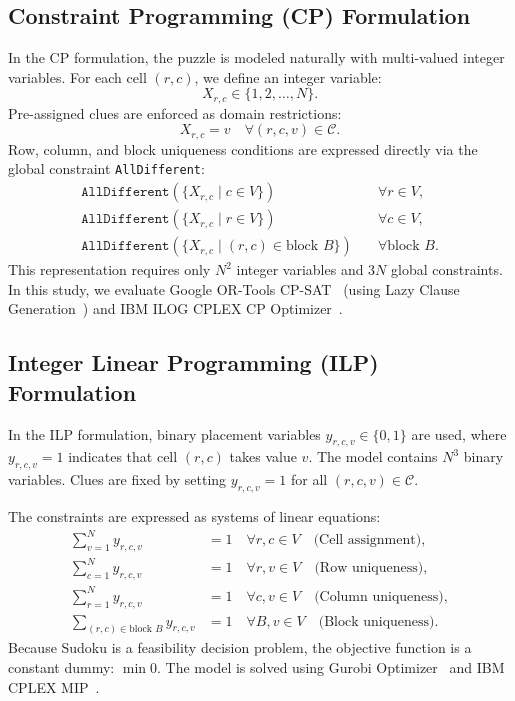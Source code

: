 \documentclass[a4paper,fleqn]{cas-sc}
\begin{document}
\subsection{Constraint Programming (CP) Formulation}
In the CP formulation, the puzzle is modeled naturally with multi-valued integer variables. For each cell $(r, c)$, we define an integer variable:
\begin{equation}
    X_{r, c} \in \{1, 2, \dots, N\}.
\end{equation}
Pre-assigned clues are enforced as domain restrictions:
\begin{equation}
    X_{r, c} = v \quad \forall (r, c, v) \in \mathcal{C}.
\end{equation}
Row, column, and block uniqueness conditions are expressed directly via the global constraint \texttt{AllDifferent}:
\begin{align}
    \texttt{AllDifferent}(\{X_{r, c} \mid c \in V\}) \quad &\forall r \in V, \\
    \texttt{AllDifferent}(\{X_{r, c} \mid r \in V\}) \quad &\forall c \in V, \\
    \texttt{AllDifferent}(\{X_{r, c} \mid (r, c) \in \text{block } B\}) \quad &\forall \text{block } B.
\end{align}
This representation requires only $N^2$ integer variables and $3N$ global constraints. In this study, we evaluate Google OR-Tools CP-SAT~\cite{ortools} (using Lazy Clause Generation~\cite{feydy2009lazy}) and IBM ILOG CPLEX CP Optimizer~\cite{cplex2022}.

\subsection{Integer Linear Programming (ILP) Formulation}
In the ILP formulation, binary placement variables $y_{r, c, v} \in \{0, 1\}$ are used, where $y_{r, c, v} = 1$ indicates that cell $(r, c)$ takes value $v$. The model contains $N^3$ binary variables. Clues are fixed by setting $y_{r, c, v} = 1$ for all $(r, c, v) \in \mathcal{C}$.

The constraints are expressed as systems of linear equations:
\begin{align}
    \sum_{v=1}^N y_{r, c, v} &= 1 \quad \forall r, c \in V \quad \text{(Cell assignment)}, \label{eq:ilp_cell} \\
    \sum_{c=1}^N y_{r, c, v} &= 1 \quad \forall r, v \in V \quad \text{(Row uniqueness)}, \label{eq:ilp_row} \\
    \sum_{r=1}^N y_{r, c, v} &= 1 \quad \forall c, v \in V \quad \text{(Column uniqueness)}, \label{eq:ilp_col} \\
    \sum_{(r, c) \in \text{block } B} y_{r, c, v} &= 1 \quad \forall B, v \in V \quad \text{(Block uniqueness)}. \label{eq:ilp_blk}
\end{align}
Because Sudoku is a feasibility decision problem, the objective function is a constant dummy: $\min 0$. The model is solved using Gurobi Optimizer~\cite{gurobi2024} and IBM CPLEX MIP~\cite{cplex2022}.
\end{document}
